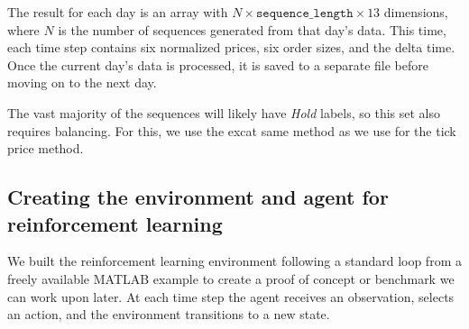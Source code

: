 \documentclass[a4paper,oneside,onecolumn,12pt]{book}
\begin{document}
		The result for each day is an array with $N \times \texttt{sequence\_length} \times 13$ dimensions, where $N$ is the number of sequences generated from that day's data. This time, each time step contains six normalized prices, six order sizes, and the delta time. Once the current day's data is processed, it is saved to a separate file before moving on to the next day.

		The vast majority of the sequences will likely have \textit{Hold} labels, so this set also requires balancing. For this, we use the excat same method as we use for the tick price method.

	\subsection{Creating the environment and agent for reinforcement learning}
	We built the reinforcement learning environment following a standard loop from a freely available MATLAB example \cite{DRLOTE} to create a proof of concept or benchmark we can work upon later. At each time step the agent receives an observation, selects an action, and the environment transitions to a new state.
\end{document}
